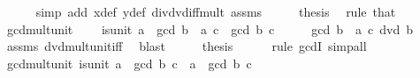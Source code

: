 \begin{isabellebody}
\ \ \ \ \isamarkupfalse%
\ {\isacharparenleft}{\kern0pt}simp\ add{\isacharcolon}{\kern0pt}\ x{\isacharunderscore}{\kern0pt}def\ y{\isacharunderscore}{\kern0pt}def\ div{\isacharunderscore}{\kern0pt}dvd{\isacharunderscore}{\kern0pt}iff{\isacharunderscore}{\kern0pt}mult\ assms{\isacharparenright}{\kern0pt}\isanewline
\ \ \isamarkupfalse%
\ \isamarkupfalse%
\ {\isacharquery}{\kern0pt}thesis\ \isamarkupfalse%
\ {\isacharparenleft}{\kern0pt}rule\ that{\isacharparenright}{\kern0pt}\isanewline
{}\isamarkupfalse%
%
\endisatagproof
{\isafoldproof}%
%
\isadelimproof
\isanewline
%
\endisadelimproof
\isanewline
{}\isamarkupfalse%
\ gcd{\isacharunderscore}{\kern0pt}mult{\isacharunderscore}{\kern0pt}unit{}{\isacharcolon}{\kern0pt}\ \isanewline
\ \ \ {\isachardoublequoteopen}is{\isacharunderscore}{\kern0pt}unit\ a{\isachardoublequoteclose}\ \ {\isachardoublequoteopen}gcd\ {\isacharparenleft}{\kern0pt}b\ {\isacharasterisk}{\kern0pt}\ a{\isacharparenright}{\kern0pt}\ c\ {\isacharequal}{\kern0pt}\ gcd\ b\ c{\isachardoublequoteclose}\isanewline
%
\isadelimproof
%
\endisadelimproof
%
\isatagproof
{}\isamarkupfalse%
\ {\isacharminus}{\kern0pt}\isanewline
\ \ \isamarkupfalse%
\ {\isachardoublequoteopen}gcd\ {\isacharparenleft}{\kern0pt}b\ {\isacharasterisk}{\kern0pt}\ a{\isacharparenright}{\kern0pt}\ c\ dvd\ b{\isachardoublequoteclose}\isanewline
\ \ \ \ \isamarkupfalse%
\ assms\ dvd{\isacharunderscore}{\kern0pt}mult{\isacharunderscore}{\kern0pt}unit{\isacharunderscore}{\kern0pt}iff\ \isamarkupfalse%
\ blast\isanewline
\ \ \isamarkupfalse%
\ \isamarkupfalse%
\ {\isacharquery}{\kern0pt}thesis\isanewline
\ \ \ \ \isamarkupfalse%
\ {\isacharparenleft}{\kern0pt}rule\ gcdI{\isacharparenright}{\kern0pt}\ simp{\isacharunderscore}{\kern0pt}all\isanewline
{}\isamarkupfalse%
%
\endisatagproof
{\isafoldproof}%
%
\isadelimproof
\isanewline
%
\endisadelimproof
\isanewline
{}\isamarkupfalse%
\ gcd{\isacharunderscore}{\kern0pt}mult{\isacharunderscore}{\kern0pt}unit{}{\isacharcolon}{\kern0pt}\ {\isachardoublequoteopen}is{\isacharunderscore}{\kern0pt}unit\ a\ {\isasymLongrightarrow}\ gcd\ b\ {\isacharparenleft}{\kern0pt}c\ {\isacharasterisk}{\kern0pt}\ a{\isacharparenright}{\kern0pt}\ {\isacharequal}{\kern0pt}\ gcd\ b\ c{\isachardoublequoteclose}\isanewline
%
\isadelimproof
\ \ %
\endisadelimproof

\end{isabellebody}
